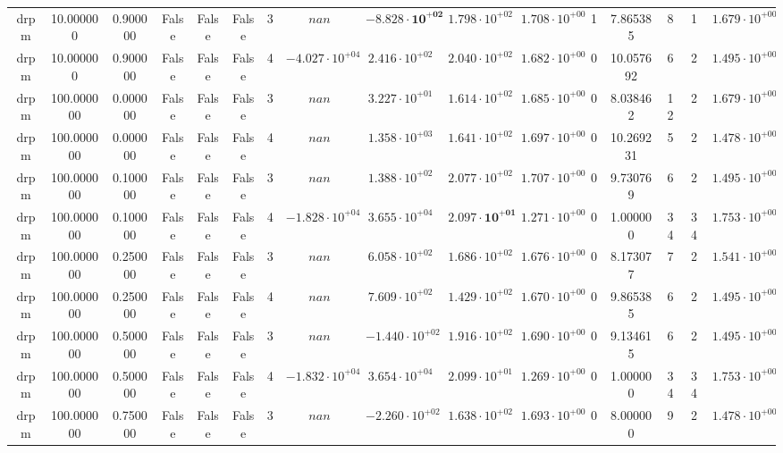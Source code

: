 \begin{table}
\begin{tabular}{cccccccccccccccc}
drpm & 10.000000 & 0.900000 & False & False & False & 3 & $nan$ & $\mathbf{-8.828 \cdot 10^{+02}}$ & $1.798 \cdot 10^{+02}$ & $1.708 \cdot 10^{+00}$ & 1 & 7.865385 & 8 & 1 & $1.679 \cdot 10^{+00}$ \\
drpm & 10.000000 & 0.900000 & False & False & False & 4 & $-4.027 \cdot 10^{+04}$ & $2.416 \cdot 10^{+02}$ & $2.040 \cdot 10^{+02}$ & $1.682 \cdot 10^{+00}$ & 0 & 10.057692 & 6 & 2 & $1.495 \cdot 10^{+00}$ \\
drpm & 100.000000 & 0.000000 & False & False & False & 3 & $nan$ & $3.227 \cdot 10^{+01}$ & $1.614 \cdot 10^{+02}$ & $1.685 \cdot 10^{+00}$ & 0 & 8.038462 & 12 & 2 & $1.679 \cdot 10^{+00}$ \\
drpm & 100.000000 & 0.000000 & False & False & False & 4 & $nan$ & $1.358 \cdot 10^{+03}$ & $1.641 \cdot 10^{+02}$ & $1.697 \cdot 10^{+00}$ & 0 & 10.269231 & 5 & 2 & $1.478 \cdot 10^{+00}$ \\
drpm & 100.000000 & 0.100000 & False & False & False & 3 & $nan$ & $1.388 \cdot 10^{+02}$ & $2.077 \cdot 10^{+02}$ & $1.707 \cdot 10^{+00}$ & 0 & 9.730769 & 6 & 2 & $1.495 \cdot 10^{+00}$ \\
drpm & 100.000000 & 0.100000 & False & False & False & 4 & $-1.828 \cdot 10^{+04}$ & $3.655 \cdot 10^{+04}$ & $\mathbf{2.097 \cdot 10^{+01}}$ & $1.271 \cdot 10^{+00}$ & 0 & 1.000000 & 34 & 34 & $1.753 \cdot 10^{+00}$ \\
drpm & 100.000000 & 0.250000 & False & False & False & 3 & $nan$ & $6.058 \cdot 10^{+02}$ & $1.686 \cdot 10^{+02}$ & $1.676 \cdot 10^{+00}$ & 0 & 8.173077 & 7 & 2 & $1.541 \cdot 10^{+00}$ \\
drpm & 100.000000 & 0.250000 & False & False & False & 4 & $nan$ & $7.609 \cdot 10^{+02}$ & $1.429 \cdot 10^{+02}$ & $1.670 \cdot 10^{+00}$ & 0 & 9.865385 & 6 & 2 & $1.495 \cdot 10^{+00}$ \\
drpm & 100.000000 & 0.500000 & False & False & False & 3 & $nan$ & $-1.440 \cdot 10^{+02}$ & $1.916 \cdot 10^{+02}$ & $1.690 \cdot 10^{+00}$ & 0 & 9.134615 & 6 & 2 & $1.495 \cdot 10^{+00}$ \\
drpm & 100.000000 & 0.500000 & False & False & False & 4 & $-1.832 \cdot 10^{+04}$ & $3.654 \cdot 10^{+04}$ & $2.099 \cdot 10^{+01}$ & $1.269 \cdot 10^{+00}$ & 0 & 1.000000 & 34 & 34 & $1.753 \cdot 10^{+00}$ \\
drpm & 100.000000 & 0.750000 & False & False & False & 3 & $nan$ & $-2.260 \cdot 10^{+02}$ & $1.638 \cdot 10^{+02}$ & $1.693 \cdot 10^{+00}$ & 0 & 8.000000 & 9 & 2 & $1.478 \cdot 10^{+00}$ \\

\end{tabular}
\end{table}
